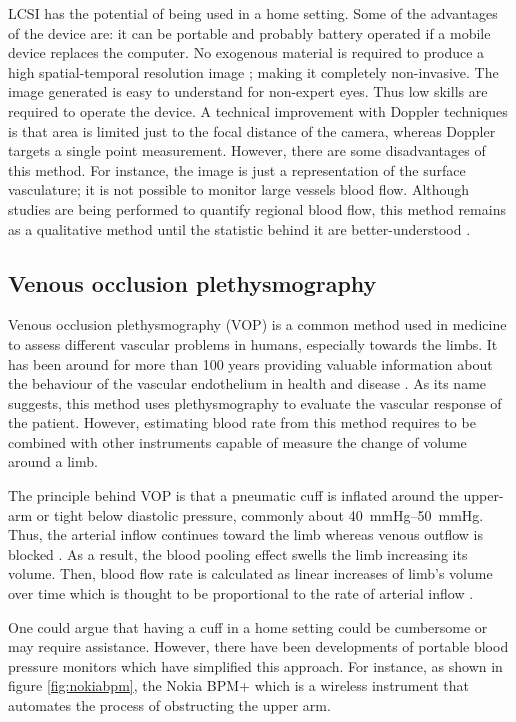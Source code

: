 LCSI has the potential of being used in a home setting. Some of the advantages of the device are: it can be portable and probably battery operated if a mobile device replaces the computer. No exogenous material is required to produce a high spatial-temporal resolution image \cite{duncan2008can}; making it completely non-invasive. The image generated is easy to understand for non-expert eyes. Thus low skills are required to operate the device. A technical improvement with Doppler techniques is that area is limited just to the focal distance of the camera, whereas Doppler targets a single point measurement. However, there are some disadvantages of this method. For instance, the image is just a representation of the surface vasculature; it is not possible to monitor large vessels blood flow. Although studies are being performed to quantify regional blood flow, this method remains as a qualitative method until the statistic behind it are better-understood \cite{duncan2008can}. 

\subsection{Venous occlusion plethysmography}
\label{section literature VOP}
Venous occlusion plethysmography (VOP) is a common method used in medicine to assess different vascular problems in humans, especially towards the limbs. It has been around for more than 100 years providing valuable information about the behaviour of the vascular endothelium in health and disease \cite{joyner2001belfast}. As its name suggests, this method uses plethysmography to evaluate the vascular response of the patient. However, estimating blood rate from this method requires to be combined with other instruments capable of measure the change of volume around a limb.

The principle behind VOP is that a pneumatic cuff is inflated around the upper-arm or tight below diastolic pressure, commonly about \SIrange{40}{50}{\mmHg}. Thus, the arterial inflow continues toward the limb whereas venous outflow is blocked \cite{joyner2001belfast, casey2008measuring}. As a result, the blood pooling effect swells the limb increasing its volume. Then, blood flow rate is calculated as linear increases of limb's volume over time which is thought to be proportional to the rate of arterial inflow \cite{joannides2006clinical, casey2008measuring}.

One could argue that having a cuff in a home setting could be cumbersome or may require assistance. However, there have been developments of portable blood pressure monitors which have simplified this approach. For instance, as shown in figure \ref{fig:nokiabpm}, the Nokia BPM+ \cite{nokiabpm} which is a wireless instrument that automates the process of obstructing the upper arm.

